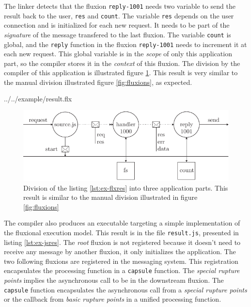 The linker detects that the fluxion \texttt{reply-1001} needs two variable to send the result back to the user, \texttt{res} and \texttt{count}.
The variable \texttt{res} depends on the user connection and is initialized for each new request.
It needs to be part of the \textit{signature} of the message transfered to the last fluxion.
The variable \texttt{count} is global, and the \texttt{reply} function in the fluxion \texttt{reply-1001} needs to increment it at each new request.
This global variable is in the \textit{scope} of only this application part, so the compiler stores it in the \textit{context} of this fluxion.
The division by the compiler of this application is illustrated figure \ref{fig:flux-3}.
This result is very similar to the manual division illustrated figure \ref{fig:fluxions}, as expected.

{../../example/result.flx}

\begin{figure}[h!]
\begin{center}
  \includegraphics[width=\linewidth]{ressources/flux-3.pdf}
  \caption{Division of the listing \ref{lst:ex-flxres} into three application parts. This result is similar to the manual division illustrated in figure \ref{fig:fluxions}}
  \label{fig:flux-3}
\end{center}
\end{figure}

The compiler also produces an executable targeting a simple implementation of the fluxional execution model.
This result is in the file \texttt{result.js}, presented in listing \ref{lst:ex-jsres}.
The \textit{root} fluxion is not registered because it doesn't need to receive any message by another fluxion, it only initializes the application.
The two following fluxions are registered in the messaging system.
This registration encapsulates the processing function in a \texttt{capsule} function.
The \textit{special rupture points} implies the asynchronous call to be in the downstream fluxion.
The \texttt{capsule} function encapsulates the asynchronous call from a \textit{special rupture points} or the callback from \textit{basic rupture points} in a unified processing function.

